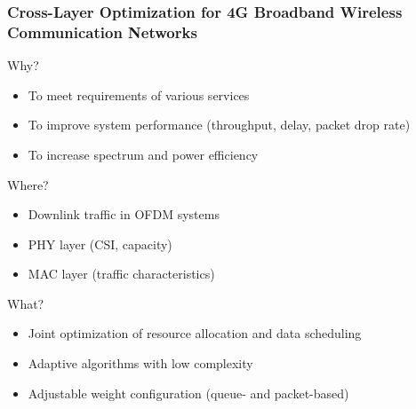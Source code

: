 \documentclass{beamer}
\begin{document}
\begin{frame}
\frametitle{Cross-Layer Optimization for 4G Broadband Wireless Communication Networks}

\begin{block}{Why?}
\begin{itemize}
  \item To meet requirements of various services
  \item To improve system performance (throughput, delay, packet drop rate)
  \item To increase spectrum and power efficiency
\end{itemize}
\end{block}

\begin{block}{Where?}
\begin{itemize}
  \item Downlink traffic in OFDM systems
  \item PHY layer (CSI, capacity)
  \item MAC layer (traffic characteristics)
\end{itemize}
\end{block}

\begin{block}{What?}
\begin{itemize}
  \item Joint optimization of resource allocation and data scheduling
  \item Adaptive algorithms with low complexity
  \item Adjustable weight configuration (queue- and packet-based)
\end{itemize}
\end{block}


\end{frame}
\end{document}
